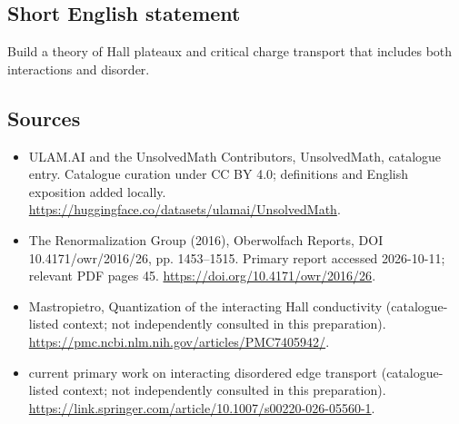 \documentclass[11pt]{article}
\begin{document}
\subsection{Short English statement}
Build a theory of Hall plateaux and critical charge transport that includes both interactions and disorder.
\subsection{Sources}
\begin{itemize}
\item[\hypertarget{source:statement:1}{S1}] ULAM.AI and the UnsolvedMath Contributors, UnsolvedMath, catalogue entry. Catalogue curation under CC BY 4.0; definitions and English exposition added locally.
\url{https://huggingface.co/datasets/ulamai/UnsolvedMath}.
\item[\hypertarget{source:statement:2}{S2}] The Renormalization Group (2016), Oberwolfach Reports, DOI 10.4171/owr/2016/26, pp. 1453--1515. Primary report accessed 2026-10-11; relevant PDF pages 45.
\url{https://doi.org/10.4171/owr/2016/26}.
\item[\hypertarget{source:statement:3}{S3}] Mastropietro, Quantization of the interacting Hall conductivity (catalogue-listed context; not independently consulted in this preparation).
\url{https://pmc.ncbi.nlm.nih.gov/articles/PMC7405942/}.
\item[\hypertarget{source:statement:4}{S4}] current primary work on interacting disordered edge transport (catalogue-listed context; not independently consulted in this preparation).
\url{https://link.springer.com/article/10.1007/s00220-026-05560-1}.
\end{itemize}
\label{end:statement}
\end{document}
